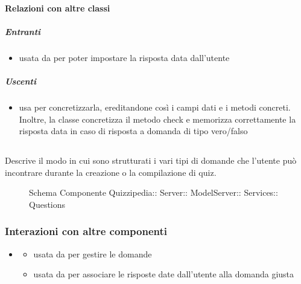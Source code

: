 \paragraph{Relazioni con altre classi}
\subparagraph{Entranti}
\begin{itemize}
\item usata da  per poter impostare la risposta data dall'utente
\end{itemize}
\subparagraph{Uscenti}
\begin{itemize}
\item usa  per concretizzarla, ereditandone così i campi dati e i metodi concreti. Inoltre, la classe concretizza il metodo check e memorizza correttamente la risposta data in caso di risposta a domanda di tipo vero/falso
\end{itemize}
\subsection{}
Descrive il modo in cui sono strutturati i vari tipi di domande che l'utente può incontrare durante la creazione o la compilazione di quiz.
\begin{figure}[H]
\centering
\noindent{}
\caption[Schema Componente Questions]{Schema Componente Quizzipedia:: Server:: ModelServer:: Services:: Questions}
\end{figure}
\subsubsection{Interazioni con altre componenti}
\begin{itemize}
\item {}
\begin{itemize}
\item usata da  per gestire le domande
\item usata da  per associare le risposte date dall'utente alla domanda giusta
\end{itemize}
\end{itemize}
